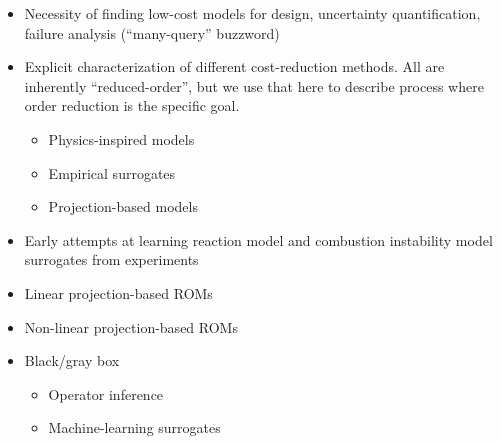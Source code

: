 \begin{itemize}
    \item Necessity of finding low-cost models for design, uncertainty quantification, failure analysis (``many-query'' buzzword)
    \item Explicit characterization of different cost-reduction methods. All are inherently ``reduced-order'', but we use that here to describe process where order reduction is the specific goal.
    \begin{itemize}
        \item Physics-inspired models
        \item Empirical surrogates
        \item Projection-based models
    \end{itemize}
    \item Early attempts at learning reaction model and combustion instability model surrogates from experiments
    \item Linear projection-based ROMs
    \item Non-linear projection-based ROMs
    \item Black/gray box
    \begin{itemize}
        \item Operator inference
        \item Machine-learning surrogates
    \end{itemize}
\end{itemize}